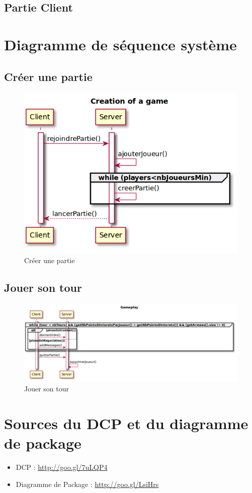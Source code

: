 	\subsection{Partie Client}
\section{Diagramme de séquence système}
	\subsection{Créer une partie}
		\vspace{10mm}
		\begin{figure}[!h]
			\centering
			\includegraphics[scale=0.5]{images/DSSCreate.png}
			\caption{Créer une partie}
		\end{figure}


	\subsection{Jouer son tour}
		\vspace{10mm}
		\begin{figure}[!h]
			\centering
			\includegraphics[scale=0.3]{images/DSSGameplay.png}
			\caption{Jouer son tour}
		\end{figure}
		\vspace{70mm}

\section{Sources du DCP et du diagramme de package}
	\begin{itemize}
		\item DCP : \url{http://goo.gl/7uLQP4}
		\item Diagramme de Package : \url{http://goo.gl/LsiHrs}
	\end{itemize}
